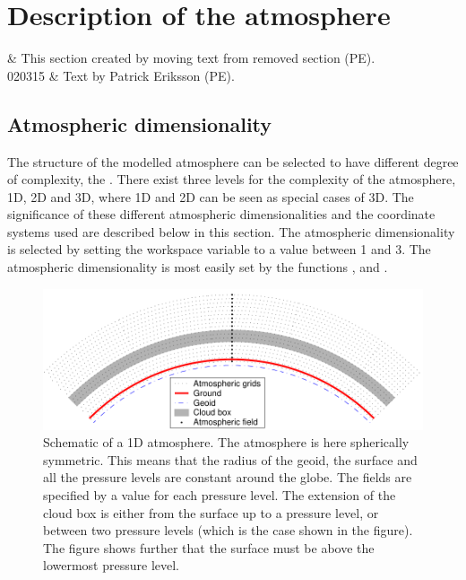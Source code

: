 \chapter{Description of the atmosphere}

 & This section created by moving text from removed section (PE).\\ 
 020315 & Text by Patrick Eriksson (PE).\\
\stophistory

\graphicspath{{Figs/atmosphere/}}


\section{Atmospheric dimensionality}

The structure of the modelled atmosphere can be selected to have
different degree of complexity, the . There exist three levels for the complexity of the
atmosphere, 1D, 2D and 3D, where 1D and 2D can be seen as special
cases of 3D. The significance of these different atmospheric
dimensionalities and the coordinate systems used are described below
in this section. The atmospheric dimensionality is selected by setting
the workspace variable  to a value between 1
and 3. The atmospheric dimensionality is most easily set by the
functions ,  and
.

\begin{figure}[!t]
 \begin{center}
  \includegraphics*[width=0.98\hsize]{atm_dim_1d}
  \caption{Schematic of a 1D atmosphere. The atmosphere is 
    here spherically symmetric. This means that the radius of the
    geoid, the surface and all the pressure levels are constant
    around the globe. The fields are specified by a value for each
    pressure level. The extension of the cloud box is either from
    the surface up to a pressure level, or between two pressure
    levels (which is the case shown in the figure). The figure shows
    further that the surface must be above the lowermost pressure
    level. }
 \end{center}
\end{figure}

